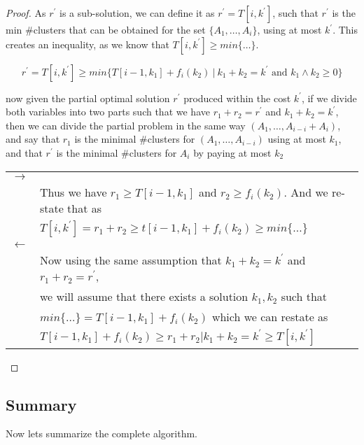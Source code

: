 \documentclass[a4paper]{article}
\begin{document}
\begin{proof}
    As $r^\prime$ is a sub-solution, we can define it as $r^\prime = T[i, k^\prime]$, such that $r^\prime$ is the min \#clusters
    that can be obtained for the set $\{A_1, \dots, A_i\}$, using at most $k^\prime$. This creates an inequality, as we know that
    $T[i, k^\prime] \geq min\{\dots\}$.

    \[
        r^\prime = T[i, k^\prime] \geq min\{ T[ i-1, k_1 ] + f_i(k_2) ~|~ k_1 + k_2 = k^\prime \text{~and~} k_1 \wedge k_2 \geq 0\}
    \]

    now given the partial optimal solution $r^\prime$ produced within the cost $k^\prime$, if we divide both variables into two parts
    such that we have $r_1 + r_2 = r^\prime$ and $k_1 + k_2 = k^\prime$, then we can divide the partial problem in the same way
    $(A_1,\dots,A_{i-i} + A_i)$, and say that $r_1$ is the minimal \#clusters for $(A_1,\dots,A_{i-i})$ using at most $k_1$, and that $r^\prime$
    is the minimal \#clusters for $A_i$ by paying at most $k_2$

    \begin{tabular}{rl}
        $\rightarrow$ &                                                                                       \\
                      & Thus we have $r_1 \geq T[i-1,k_1]$ and $r_2 \geq f_i(k_2)$. And we re-state that as   \\
                      & $T[i,k^\prime] = r_1+r_2 \geq t[i-1,k_1]+f_i(k_2) \geq min\{\dots\}$                  \\
        $\leftarrow$  &                                                                                       \\
                      & Now using the same assumption that $k_1 + k_2 = k^\prime$ and $r_1 + r_2 = r^\prime$, \\
                      & we will assume that there exists a solution $k_1,k_2$ such that                       \\
                      & $min\{\dots\} = T[i-1,k_1] + f_i(k_2)$ which we can restate as                        \\
                      & $T[i-1,k_1] + f_i(k_2) \geq r_1+r_2 | k_1+k_2 = k^\prime \geq T[i,k^\prime]$
    \end{tabular}
\end{proof}

\subsection{Summary}
Now lets summarize the complete algorithm. 
\end{document}
